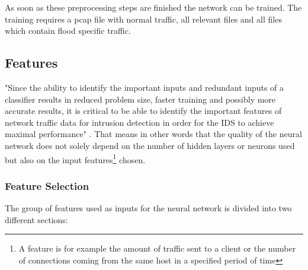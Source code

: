 As soon as these preprocessing steps are finished the network can be trained. The training requires a pcap file with normal traffic, all relevant files and all files which contain flood specific traffic. 

\subsection{Features}

"Since the ability to identify the important inputs and redundant inputs of a classifier results in reduced problem size, faster training and possibly more accurate results, it is critical to be able to identify the important features of network traffic data for intrusion detection in order for the IDS to achieve maximal performance" \cite{nn_features}. That means in other words that the quality of the neural network does not solely depend on the number of hidden layers or neurons used but also on the input features\footnote{A feature is for example the amount of traffic sent to a client or the number of connections coming from the same host in a specified period of time} chosen.

\subsubsection{Feature Selection}
\label{sec:features}

The group of features used as inputs for the neural network is divided into two different sections:

